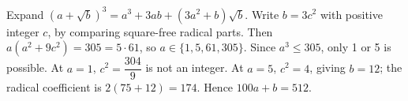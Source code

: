 Expand $(a+\sqrt b)^3=a^3+3ab+(3a^2+b)\sqrt b$. Write $b=3c^2$ with positive integer $c$, by comparing square-free radical parts. Then $a(a^2+9c^2)=305=5\cdot61$, so $a\in\{1,5,61,305\}$. Since $a^3\le305$, only 1 or 5 is possible. At $a=1$, $c^2=\dfrac{304}{9}$ is not an integer. At $a=5$, $c^2=4$, giving $b=12$; the radical coefficient is $2(75+12)=174$. Hence $\boxed{100a+b=512}$.
